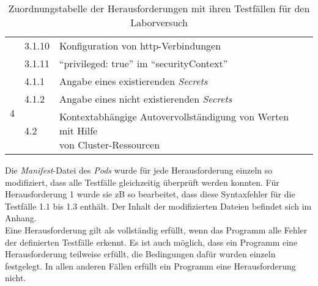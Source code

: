 \begin{table}[t]
\begin{tabularx}{\columnwidth}{lllX}
                                                                                 & 3.1.10                                                              & Konfiguration von \ac{http}-Verbindungen                                 \\
                                                                                 & 3.1.11                                                              & ``privileged: true'' im ``securityContext''                              \\
    \midrule
    \multirow{3}{*}{4}                                                           & 4.1.1                                                               & Angabe eines existierenden \textit{Secrets}                              \\
                                                                                 & 4.1.2                                                               & Angabe eines nicht existierenden \textit{Secrets}                        \\
                                                                                 & 4.2                                                                 & \makecell[l]{Kontextabhängige Autovervollständigung von Werten mit Hilfe \\ von Cluster-Ressourcen} \\

    \bottomrule
  \end{tabularx}
  \caption{Zuordnungstabelle der Herausforderungen mit ihren Testfällen für den Laborversuch}
  \label{tbl:test-cases-experiment}
\end{table}
Die \textit{Manifest}-Datei des \textit{Pods} wurde für jede Herausforderung einzeln so modifiziert, dass alle Testfälle gleichzeitig überprüft werden konnten.
Für Herausforderung 1 wurde sie \ac{zB} so bearbeitet, dass diese Syntaxfehler für die Testfälle 1.1 bis 1.3 enthält.
Der Inhalt der modifizierten Dateien befindet sich im Anhang.
\\
Eine Herausforderung gilt als vollständig erfüllt, wenn das Programm alle Fehler der definierten Testfälle erkennt.
Es ist auch möglich, dass ein Programm eine Herausforderung teilweise erfüllt, die Bedingungen dafür wurden einzeln festgelegt.
In allen anderen Fällen erfüllt ein Programm eine Herausforderung nicht.

